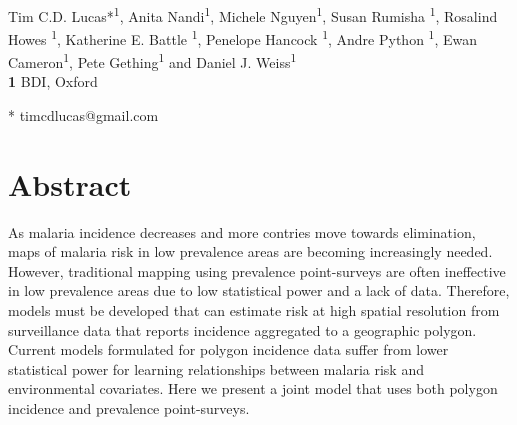 \documentclass[10pt,letterpaper]{article}
\begin{document}
\vspace*{0.2in}

\begin{flushleft}
{\Large
\textbf{} %
}
\newline
\\
Tim C.D. Lucas*\textsuperscript{1}, Anita Nandi\textsuperscript{1}, Michele Nguyen\textsuperscript{1}, Susan Rumisha \textsuperscript{1}, Rosalind Howes \textsuperscript{1}, Katherine E. Battle \textsuperscript{1}, Penelope Hancock \textsuperscript{1}, Andre Python \textsuperscript{1}, Ewan Cameron\textsuperscript{1}, Pete Gething\textsuperscript{1} and Daniel J. Weiss\textsuperscript{1}
\\
\bigskip
\textbf{1} BDI, Oxford
\\
\bigskip

% 
%




* timcdlucas@gmail.com

\end{flushleft}
\section*{Abstract}
As malaria incidence decreases and more contries move towards elimination, maps of malaria risk in low prevalence areas are becoming increasingly needed.
However, traditional mapping using prevalence point-surveys are often ineffective in low prevalence areas due to low statistical power and a lack of data.
Therefore, models must be developed that can estimate risk at high spatial resolution from surveillance data that reports incidence aggregated to a geographic polygon.
Current models formulated for polygon incidence data suffer from lower statistical power for learning relationships between malaria risk and environmental covariates.
Here we present a joint model that uses both polygon incidence and prevalence point-surveys.
\end{document}
